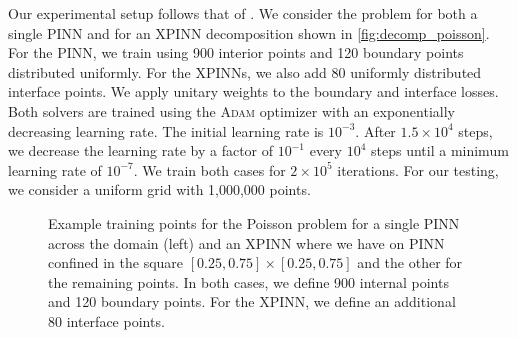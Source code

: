Our experimental setup follows that of \textcite{müller2023achieving}.
We consider the problem for both a single PINN and for an XPINN decomposition shown in \autoref{fig:decomp_poisson}.
For the PINN, we train using 900 interior points and 120 boundary points distributed uniformly.
For the XPINNs, we also add 80 uniformly distributed interface points. We apply unitary weights to the boundary and interface losses.
Both solvers are trained using the \textsc{Adam} optimizer with an exponentially decreasing learning rate.
The initial learning rate is $10^{-3}$.
After $1.5\times 10^4$ steps, we decrease the learning rate by a factor of $10^{-1}$ every $10^4$ steps until a minimum learning rate of $10^{-7}$.
We train both cases for $2\times 10^5$ iterations. For our testing, we consider a uniform grid with 1,000,000 points. 


\begin{figure}[t]
    \hfill
    \caption{Example training points for the Poisson problem for a single PINN across the domain (left) and an XPINN where we have on PINN confined in the square $[0.25, 0.75]\times [0.25, 0.75]$ and the other for the remaining points. In both cases, we define 900 internal points and 120 boundary points. For the XPINN, we define an additional 80 interface points.}
    \label{fig:decomp_poisson}
\end{figure}


